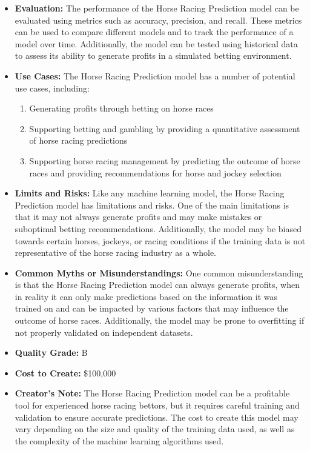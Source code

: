 \begin{itemize}
\item \textbf{Evaluation:} The performance of the Horse Racing Prediction model can be evaluated using metrics such as accuracy, precision, and recall. These metrics can be used to compare different models and to track the performance of a model over time. Additionally, the model can be tested using historical data to assess its ability to generate profits in a simulated betting environment.
\item \textbf{Use Cases:} The Horse Racing Prediction model has a number of potential use cases, including:
\begin{enumerate}
\item Generating profits through betting on horse races
\item Supporting betting and gambling by providing a quantitative assessment of horse racing predictions
\item Supporting horse racing management by predicting the outcome of horse races and providing recommendations for horse and jockey selection
\end{enumerate}
\item \textbf{Limits and Risks:} Like any machine learning model, the Horse Racing Prediction model has limitations and risks. One of the main limitations is that it may not always generate profits and may make mistakes or suboptimal betting recommendations. Additionally, the model may be biased towards certain horses, jockeys, or racing conditions if the training data is not representative of the horse racing industry as a whole.
\item \textbf{Common Myths or Misunderstandings:} One common misunderstanding is that the Horse Racing Prediction model can always generate profits, when in reality it can only make predictions based on the information it was trained on and can be impacted by various factors that may influence the outcome of horse races. Additionally, the model may be prone to overfitting if not properly validated on independent datasets.
\item \textbf{Quality Grade:} B
\item \textbf{Cost to Create:} \$100,000
\item \textbf{Creator's Note:} The Horse Racing Prediction model can be a profitable tool for experienced horse racing bettors, but it requires careful training and validation to ensure accurate predictions. The cost to create this model may vary depending on the size and quality of the training data used, as well as the complexity of the machine learning algorithms used.
\end{itemize}

